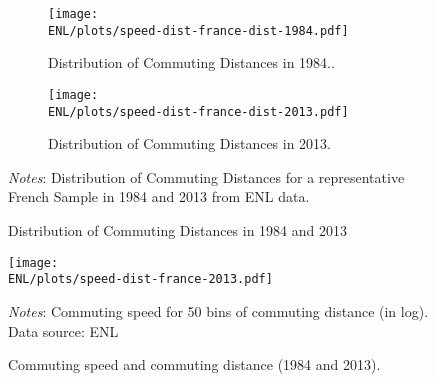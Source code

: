 \documentclass[11pt]{report}
\newcommand{\ENL}{../../output/CASD/2021-03-31/ENL}
\begin{document}
\begin{figure}[p]
	\begin{adjustbox}{center}	
		\begin{subfigure}{0.6\textwidth}
			\texttt{[image: \\ENL/plots/speed-dist-france-dist-1984.pdf]}
			\vspace{-0.65cm}
			\caption{Distribution of Commuting Distances in 1984.\label{A-fig:ENL-dist-1984}.}
		\end{subfigure}
		\hspace{-1cm}
		\begin{subfigure}{0.6\textwidth}
			\texttt{[image: \\ENL/plots/speed-dist-france-dist-2013.pdf]}
			\vspace{-0.65cm}
			\caption{Distribution of Commuting Distances in 2013.\label{A-fig:ENL-dist-2013}}
		\end{subfigure}	
	\end{adjustbox}		
	\vspace{-0.25cm}
	\caption{Distribution of Commuting Distances in 1984 and 2013}
	{\footnotesize \textit{Notes}: Distribution of Commuting Distances for a representative French Sample in 1984 and 2013 from ENL data.}
\end{figure} 



\begin{figure}[p]
	\centering
	\texttt{[image: \\ENL/plots/speed-dist-france-2013.pdf]}
	\vspace{-0.5cm}
	\caption{Commuting speed and commuting distance (1984 and 2013).\label{A-fig:speed-dist-1984-2013}}
	{\footnotesize \textit{Notes}: Commuting speed for 50 bins of commuting distance (in log). Data source: ENL}
	
\end{figure}
\end{document}
